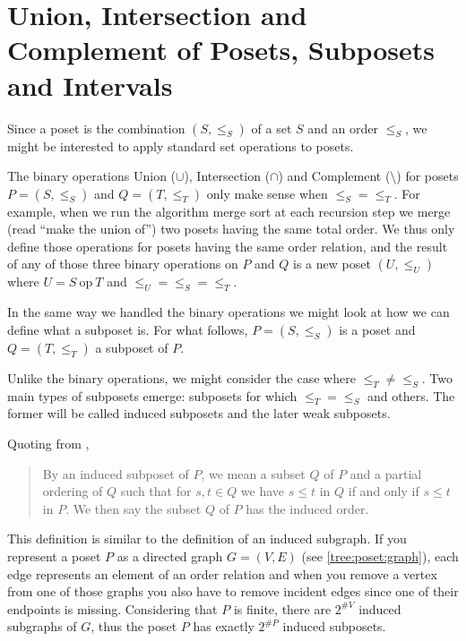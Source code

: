 \section{Union, Intersection and Complement of Posets, Subposets and Intervals}
\label{tree:poset:sub}


Since a poset is the combination $(S, \le_S)$ of a set $S$ and an order $\le_S$, we might be interested to apply standard set operations to posets.

The binary operations Union ($\cup$), Intersection ($\cap$) and Complement ($\setminus$) for posets $P = (S, \le_S)$ and $Q = (T, \le_T)$ only make sense when $\le_S = \le_T$. For example, when we run the algorithm merge sort at each recursion step we merge (read ``make the union of'') two posets having the same total order. We thus only define those operations for posets having the same order relation, and the result of any of those three binary operations on $P$ and $Q$ is a new poset $(U, \le_U)$ where $U = S~\text{op}~T$ and $\le_U = \le_S = \le_T$.


In the same way we handled the binary operations we might look at how we can define what a subposet is. For what follows, $P = (S, \le_S)$ is a poset and $Q = (T, \le_T)$ a subposet of $P$.

Unlike the binary operations, we might consider the case where $\le_T \neq \le_S$. Two main types of subposets emerge: subposets for which $\le_T = \le_S$ and others. The former will be called induced subposets and the later weak subposets.

Quoting from \cite{Stanley:2011:ECV:2124415},

\begin{quotation}

By an induced subposet of $P$, we mean a subset $Q$ of $P$ and a partial ordering of $Q$ such that for $s, t \in Q$ we have $s \leq t$ in $Q$ if and only if $s \leq t$ in $P$. We then say the subset $Q$ of $P$ has the induced order.

\end{quotation}

This definition is similar to the definition of an induced subgraph. If you represent a poset $P$ as a directed graph $G = (V, E)$ (see \ref{tree:poset:graph}), each edge represents an element of an order relation and when you remove a vertex from one of those graphs you also have to remove incident edges since one of their endpoints is missing. Considering that $P$ is finite, there are $2^{\#V}$ induced subgraphs of $G$, thus the poset $P$ has exactly $2^{\#P}$ induced subposets.

